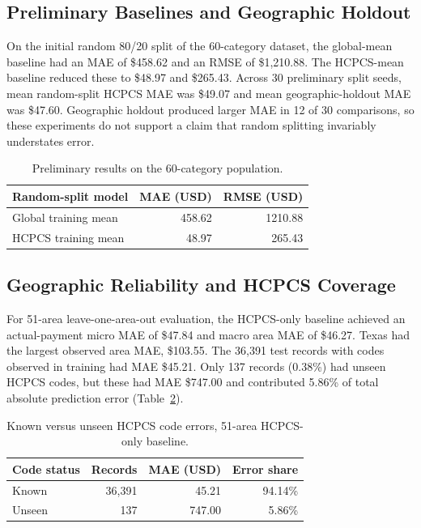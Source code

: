 \subsection{Preliminary Baselines and Geographic Holdout}
On the initial random 80/20 split of the 60-category dataset, the global-mean baseline had an MAE of \$458.62 and an RMSE of \$1,210.88. The HCPCS-mean baseline reduced these to \$48.97 and \$265.43. Across 30 preliminary split seeds, mean random-split HCPCS MAE was \$49.07 and mean geographic-holdout MAE was \$47.60. Geographic holdout produced larger MAE in 12 of 30 comparisons, so these experiments do not support a claim that random splitting invariably understates error.
\begin{table}[!htbp]\centering
\caption{Preliminary results on the 60-category population.}\label{tab:preliminary}
\begin{tabular}{lrr}\toprule
Random-split model & MAE (USD) & RMSE (USD)\\\midrule
Global training mean & 458.62 & 1210.88\\
HCPCS training mean & 48.97 & 265.43\\
\bottomrule\end{tabular}\end{table}
\subsection{Geographic Reliability and HCPCS Coverage}
For 51-area leave-one-area-out evaluation, the HCPCS-only baseline achieved an actual-payment micro MAE of \$47.84 and macro area MAE of \$46.27. Texas had the largest observed area MAE, \$103.55. The 36,391 test records with codes observed in training had MAE \$45.21. Only 137 records (0.38\%) had unseen HCPCS codes, but these had MAE \$747.00 and contributed 5.86\% of total absolute prediction error (Table~\ref{tab:coverage}).
\begin{table}[!htbp]\centering
\caption{Known versus unseen HCPCS code errors, 51-area HCPCS-only baseline.}\label{tab:coverage}
\begin{tabular}{lrrr}\toprule
Code status & Records & MAE (USD) & Error share\\\midrule
Known & 36,391 & 45.21 & 94.14\%\\
Unseen & 137 & 747.00 & 5.86\%\\
\bottomrule\end{tabular}\end{table}

